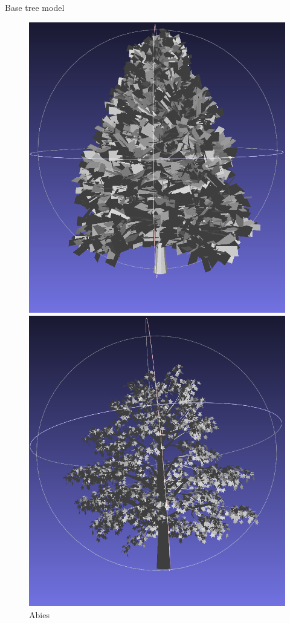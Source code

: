 \documentclass[10pt]{beamer}
\begin{document}
\begin{frame}{Base tree model}
  \Large
  \begin{figure}[H]
    \centering
    \begin{minipage}{0.24\textwidth}
        \centering
        \includegraphics[width=\textwidth]{images/abies.png}
        \caption{Abies}
    \end{minipage}\hfill
    \begin{minipage}{0.24\textwidth}
        \centering
        \includegraphics[width=\textwidth]{images/acer.png}

\end{minipage}
\end{figure}
\end{frame}
\end{document}
